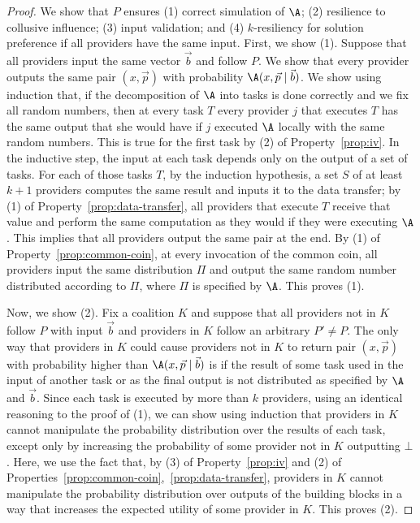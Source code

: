 \begin{proof}
\label{app:allocator}
We show that $P$ ensures (1) correct simulation of $\A$; (2) resilience to collusive influence;
(3) input validation; and (4) $k$-resiliency for solution preference if all providers have the same input.
First, we show (1). Suppose that all providers input the same vector $\vec{b}$
and follow $P$. We show that every provider outputs the same pair $(x,\vec{p})$
with probability $\A(x,\vec{p} \mid \vec{b})$. We show using induction that,
if the decomposition of $\A$ into tasks is done correctly and we fix all random
numbers, then at every task $T$ every provider $j$ that executes $T$ has the same output
that she would have if $j$ executed $\A$ locally with the same random numbers.
This is true for the first task by (2) of Property~\ref{prop:iv}. In the inductive step,
the input at each task depends only on the output of a set of tasks.
For each of those tasks $T$, by the induction hypothesis,
a set $S$ of at least $k+1$ providers computes the 
same result and inputs it to the data transfer;
by (1) of Property~\ref{prop:data-transfer}, all providers that execute $T$
receive that value and perform the same computation as they would if they were executing $\A$.
This implies that all providers output the same pair at the end.
By (1) of Property~\ref{prop:common-coin}, at every invocation
of the common coin, all providers input the same distribution $\Pi$ and output the same random number
distributed according to $\Pi$, where $\Pi$ is specified by $\A$. This proves (1).

Now, we show (2). Fix a coalition $K$ and suppose that all providers 
not in $K$ follow $P$ with input $\vec{b}$ and providers in $K$ follow an arbitrary $P' \ne P$.
The only way that providers in $K$ could cause providers not in $K$
to return pair $(x,\vec{p})$ with probability higher than $\A(x,\vec{p} \mid \vec{b})$
is if the result of some task used in the input of another task or as the final output
is not distributed as specified by $\A$ and $\vec{b}$.
Since each task is executed by more than $k$ providers, 
using an identical reasoning to the proof of (1), we can show using induction
that providers in $K$ cannot manipulate the probability distribution over the results
of each task, except only by increasing the probability of some provider 
not in $K$ outputting $\bot$. Here, we use the fact that,
by (3) of Property~\ref{prop:iv} and
(2) of Properties~\ref{prop:common-coin},~\ref{prop:data-transfer},
providers in $K$ cannot manipulate the probability distribution over
outputs of the building blocks in a way that increases
the expected utility of some provider in $K$. This proves (2).


\end{proof}
